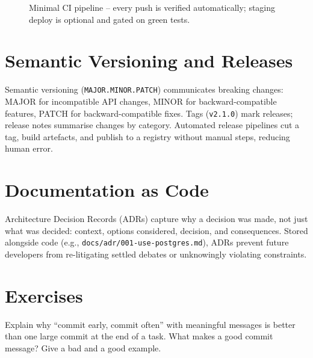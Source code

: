 \begin{figure}[h]
\centering
{}
\caption{Minimal CI pipeline -- every push is verified automatically; staging deploy is optional and gated on green tests.}
\end{figure}


\section{Semantic Versioning and Releases}

Semantic versioning (\texttt{MAJOR.MINOR.PATCH}) communicates breaking changes: MAJOR for incompatible API changes, MINOR for backward-compatible features, PATCH for backward-compatible fixes. Tags (\texttt{v2.1.0}) mark releases; release notes summarise changes by category. Automated release pipelines cut a tag, build artefacts, and publish to a registry without manual steps, reducing human error.

\section{Documentation as Code}

Architecture Decision Records (ADRs) capture why a decision was made, not just what was decided: context, options considered, decision, and consequences. Stored alongside code (e.g., \texttt{docs/adr/001-use-postgres.md}), ADRs prevent future developers from re-litigating settled debates or unknowingly violating constraints.

\section{Exercises}

\begin{exercise}
Explain why ``commit early, commit often'' with meaningful messages is better than one large commit at the end of a task. What makes a good commit message? Give a bad and a good example.
\end{exercise}

